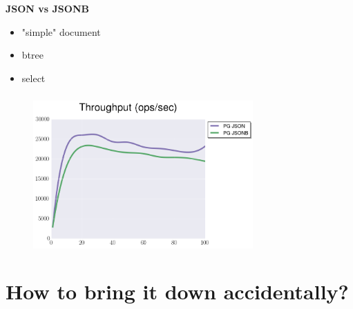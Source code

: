 \documentclass[usenames,dvipsnames, 18pt, compress, aspectratio=169]{beamer}
\begin{document}
\begin{frame}
    \frametitle{}
    \begin{center}
        \textbf{JSON vs JSONB}
        \begin{itemize}[label={}]
            \item "simple" document
            \item btree
            \item select
        \end{itemize}
    \end{center}
\end{frame}

\begin{frame}
    \frametitle{}
    \begin{center}
    \begin{figure}
        \includegraphics[width=0.75\textwidth,center]{benchmarks/postgresql_select_json_jsonb.png}
    \end{figure}
    \end{center}
\end{frame}

\fontsize{13pt}{14}\selectfont
\section{How to bring it down accidentally?}
\fontsize{17pt}{18}\selectfont
\end{document}
